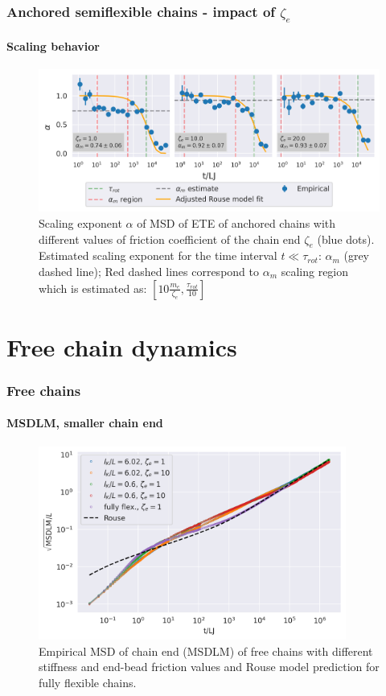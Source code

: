 \documentclass[handout]{beamer}
\begin{document}

\begin{frame}
    \frametitle{Anchored semiflexible chains - impact of $\zeta_e$}
    \framesubtitle{Scaling behavior}
    \begin{figure}[h]
        \includegraphics[width=\textwidth]{14+15+16-exp-alpha.png}
        \caption{Scaling exponent $\alpha$ of MSD of ETE 
        of anchored chains with different values of
        friction coefficient of the chain end $\zeta_e$ (blue dots).
        Estimated scaling exponent for the time interval
        $t \ll \tau_{rot}$: $\alpha_m$ (grey dashed line); Red dashed lines
        correspond to $\alpha_m$ scaling region which is estimated as:
        $[10 \frac{m_e}{\zeta_e}, \frac{\tau_{rot}}{10}]$
        }
    \end{figure}
\end{frame}


\section{Free chain dynamics}


\begin{frame}
    \frametitle{Free chains}
    \framesubtitle{MSDLM, smaller chain end}
    \begin{figure}[h]
        \includegraphics[width=0.9\textwidth]{17+18+19+20-exp-msd-fm-log.png}
        \caption{
            Empirical MSD of chain end (MSDLM) of free chains
            with different stiffness and end-bead friction values and
            Rouse model prediction for fully flexible chains.
        }
    \end{figure}
\end{frame}
\end{document}
